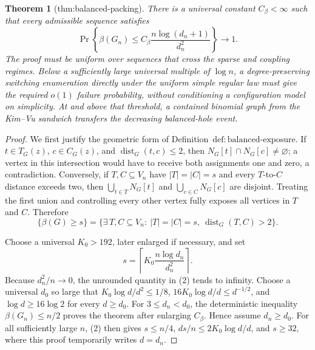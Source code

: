 \documentclass{article}
\newtheorem{theorem}{Theorem}
\begin{document}
\begin{theorem}[thm:balanced-packing]\label{thm:balanced-packing}
There is a universal constant \(C_\beta<\infty\) such that every admissible sequence satisfies \[\Pr\!\left\{\beta(G_n)\le C_\beta\frac{n\log(d_n+1)}{d_n^2}\right\}\longrightarrow1.\] The proof must be uniform over sequences that cross the sparse and coupling regimes. Below a sufficiently large universal multiple of \(\log n\), a degree-preserving switching enumeration directly under the uniform simple regular law must give the required \(o(1)\) failure probability, without conditioning a configuration model on simplicity. At and above that threshold, a contained binomial graph from the Kim--Vu sandwich transfers the decreasing balanced-hole event.
\end{theorem}
\begin{proof}
We first justify the geometric form of Definition~\(\mathrm{def{:}balanced\mbox{-}exposure}\).  If \(t\in T_G(z)\), \(c\in C_G(z)\), and \(\operatorname{dist}_G(t,c)\le2\), then \(N_G[t]\cap N_G[c]\ne\varnothing\); a vertex in this intersection would have to receive both assignments one and zero, a contradiction.  Conversely, if \(T,C\subseteq V_n\) have \(|T|=|C|=s\) and every \(T\)-to-\(C\) distance exceeds two, then \(\bigcup_{t\in T}N_G[t]\) and \(\bigcup_{c\in C}N_G[c]\) are disjoint.  Treating the first union and controlling every other vertex fully exposes all vertices in \(T\) and \(C\).  Therefore
\[
\{\beta(G)\ge s\}
=\{\exists\,T,C\subseteq V_n:\ |T|=|C|=s,\ \operatorname{dist}_G(T,C)>2\}.
\tag{1}
\]

Choose a universal \(K_0>192\), later enlarged if necessary, and set
\[
s=\left\lceil K_0\frac{n\log d_n}{d_n^2}\right\rceil.
\tag{2}
\]
Because \(d_n^2/n\to0\), the unrounded quantity in (2) tends to infinity.  Choose a universal \(d_0\) so large that \(K_0\log d/d^2\le1/8\), \(16K_0\log d/d\le d^{-1/2}\), and \(\log d\ge16\log2\) for every \(d\ge d_0\).  For \(3\le d_n<d_0\), the deterministic inequality \(\beta(G_n)\le n/2\) proves the theorem after enlarging \(C_\beta\).  Hence assume \(d_n\ge d_0\).  For all sufficiently large \(n\), (2) then gives \(s\le n/4\), \(ds/n\le2K_0\log d/d\), and \(s\ge32\), where this proof temporarily writes \(d=d_n\).


\end{proof}
\end{document}
